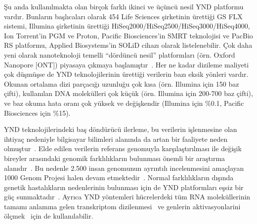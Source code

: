 \documentclass[11pt]{article}
\begin{document}
Şu anda kullanılmakta olan birçok farklı ikinci ve üçüncü nesil YND platformu vardır. Bunların başlıcaları olarak 454 Life Sciences şirketinin ürettiği GS FLX sistemi, Illumina şirketinin ürettiği HiSeq2000/HiSeq2500/HiSeq3000/HiSeq4000, Ion Torrent'in PGM ve Proton, Pacific Biosciences'in SMRT teknolojisi ve PacBio RS platformu, Applied Biosystems'in SOLiD cihazı olarak listelenebilir. Çok daha yeni olarak nanoteknoloji temelli ``dördüncü nesil'' platformları (örn. Oxford Nanopore [ONT]) piyasaya çıkmaya başlamıştır~\cite{Metzker2010,Loman2015}. Her ne kadar dizileme maliyeti çok düşmüşse de YND teknolojilerinin ürettiği verilerin bazı eksik yönleri vardır. Okunan ortalama dizi parçacığı uzunluğu çok kısa (örn. Illumina için 150 baz çifti), kullanılan DNA molekülleri çok küçük (örn. Illumina için 200-700 baz çifti), ve baz okuma hata oranı çok yüksek ve değişkendir (Illumina için \%0.1, Pacific Biosciences için \%15).


YND teknolojilerindeki baş döndürücü ilerleme, bu verilerin işlenmesine olan ihtiyaç nedeniyle bilgisayar bilimleri alanında da artan bir faaliyete neden olmuştur~\cite{Pop2008}. Elde edilen verilerin referans genomuyla karşılaştırılması ile değişik bireyler arasındaki genomik farklılıkların bulunması önemli bir araştırma alanıdır~\cite{Alkan2011,DePristo2011}. Bu nedenle 2.500 insan genomunun ayrıntılı incelenmesini amaçlayan 1000 Genom Projesi halen devam etmektedir~\cite{1000GP,1000GP2012}. Normal farklılıkların dışında genetik hastalıkların nedenlerinin bulunması için de YND platformları eşsiz bir güç sunmaktadır~\cite{Bamshad2011}. Ayrıca YND yöntemleri hücrelerdeki tüm RNA moleküllerinin tamamı anlamına gelen transkriptom dizilenmesi~\cite{Wang2009} ve genlerin aktivasyonlarini ölçmek~\cite{Park2009} için de kullanılabilir. 
\end{document}
